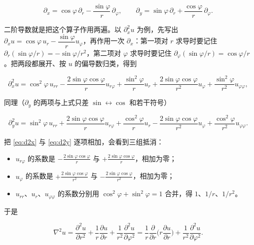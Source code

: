\documentclass[11pt]{ctexart}
\begin{document}
\begin{equation}
\partial_x=\cos\varphi\,\partial_r-\frac{\sin\varphi}{r}\,\partial_\varphi,
\qquad
\partial_y=\sin\varphi\,\partial_r+\frac{\cos\varphi}{r}\,\partial_\varphi .
\label{eq:d1}
\end{equation}

二阶导数就是把这个算子作用两遍。以 $\partial_x^2u$ 为例，先写出 $\partial_xu=\cos\varphi\,u_r-\dfrac{\sin\varphi}{r}u_\varphi$，再作用一次 $\partial_x$：第一项对 $r$ 求导时要记住 $\partial_r(\sin\varphi/r)=-\sin\varphi/r^2$，第二项对 $\varphi$ 求导时要记住 $\partial_\varphi(\sin\varphi/r)=\cos\varphi/r$。把两段都展开、按 $u$ 的偏导数归类，得到

\begin{equation}
\partial_x^2u=\cos^2\varphi\,u_{rr}-\frac{2\sin\varphi\cos\varphi}{r}u_{r\varphi}
+\frac{\sin^2\varphi}{r}u_r+\frac{2\sin\varphi\cos\varphi}{r^2}u_\varphi
+\frac{\sin^2\varphi}{r^2}u_{\varphi\varphi},
\label{eq:d2x}
\end{equation}

同理（$\partial_y$ 的两项与上式只差 $\sin\leftrightarrow\cos$ 和若干符号）

\begin{equation}
\partial_y^2u=\sin^2\varphi\,u_{rr}+\frac{2\sin\varphi\cos\varphi}{r}u_{r\varphi}
+\frac{\cos^2\varphi}{r}u_r-\frac{2\sin\varphi\cos\varphi}{r^2}u_\varphi
+\frac{\cos^2\varphi}{r^2}u_{\varphi\varphi}.
\label{eq:d2y}
\end{equation}

把 \eqref{eq:d2x} 与 \eqref{eq:d2y} 逐项相加，会看到三组抵消：

\begin{itemize}
  \item $u_{r\varphi}$ 的系数是 $-\frac{2\sin\varphi\cos\varphi}{r}$ 与 $+\frac{2\sin\varphi\cos\varphi}{r}$，相加为零；
  \item $u_\varphi$ 的系数是 $+\frac{2\sin\varphi\cos\varphi}{r^2}$ 与 $-\frac{2\sin\varphi\cos\varphi}{r^2}$，相加为零；
  \item $u_{rr}$、$u_r$、$u_{\varphi\varphi}$ 的系数分别用 $\cos^2\varphi+\sin^2\varphi=1$ 合并，得 $1$、$1/r$、$1/r^2$。
\end{itemize}

于是

\begin{equation}
\nabla^2u=\frac{\partial^2u}{\partial r^2}+\frac1r\frac{\partial u}{\partial r}
+\frac1{r^2}\frac{\partial^2u}{\partial\varphi^2}
=\frac1r\frac{\partial}{\partial r}\Big(r\frac{\partial u}{\partial r}\Big)
+\frac1{r^2}\frac{\partial^2u}{\partial\varphi^2}.
\label{eq:lap}
\end{equation}
\end{document}

